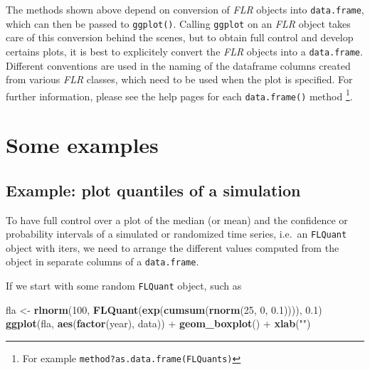 \documentclass[]{article}
\newenvironment{Shaded}{\begin{snugshade}}{\end{snugshade}}
\newcommand{\KeywordTok}[1]{\textcolor[rgb]{0.13,0.29,0.53}{\textbf{{#1}}}}
\newcommand{\DecValTok}[1]{\textcolor[rgb]{0.00,0.00,0.81}{{#1}}}
\newcommand{\FloatTok}[1]{\textcolor[rgb]{0.00,0.00,0.81}{{#1}}}
\newcommand{\StringTok}[1]{\textcolor[rgb]{0.31,0.60,0.02}{{#1}}}
\newcommand{\NormalTok}[1]{{#1}}
\let\rmarkdownfootnote\footnote%
\def\footnote{\protect\rmarkdownfootnote}
\begin{document}
The methods shown above depend on conversion of \emph{FLR} objects into
\texttt{data.frame}, which can then be passed to \texttt{ggplot()}.
Calling \texttt{ggplot} on an \emph{FLR} object takes care of this
conversion behind the scenes, but to obtain full control and develop
certains plots, it is best to explicitely convert the \emph{FLR} objects
into a \texttt{data.frame}. Different conventions are used in the naming
of the dataframe columns created from various \emph{FLR} classes, which
need to be used when the plot is specified. For further information,
please see the help pages for each \texttt{data.frame()} method
\footnote{For example
  \texttt{method?as.data.frame(\textquotesingle{}FLQuants\textquotesingle{})}}.

\section{Some examples}\label{some-examples}

\subsection{Example: plot quantiles of a
simulation}\label{example-plot-quantiles-of-a-simulation}

To have full control over a plot of the median (or mean) and the
confidence or probability intervals of a simulated or randomized time
series, i.e.~an \texttt{FLQuant} object with iters, we need to arrange
the different values computed from the object in separate columns of a
\texttt{data.frame}.

If we start with some random \texttt{FLQuant} object, such as

\begin{Shaded}
\begin{Highlighting}[]
\NormalTok{fla <-}\StringTok{ }\KeywordTok{rlnorm}\NormalTok{(}\DecValTok{100}\NormalTok{, }\KeywordTok{FLQuant}\NormalTok{(}\KeywordTok{exp}\NormalTok{(}\KeywordTok{cumsum}\NormalTok{(}\KeywordTok{rnorm}\NormalTok{(}\DecValTok{25}\NormalTok{, }\DecValTok{0}\NormalTok{, }\FloatTok{0.1}\NormalTok{)))), }\FloatTok{0.1}\NormalTok{) }
\KeywordTok{ggplot}\NormalTok{(fla, }\KeywordTok{aes}\NormalTok{(}\KeywordTok{factor}\NormalTok{(year), data)) +}\StringTok{ }\KeywordTok{geom_boxplot}\NormalTok{() +}\StringTok{ }\KeywordTok{xlab}\NormalTok{(}\StringTok{""}\NormalTok{)}
\end{Highlighting}
\end{Shaded}
\end{document}
